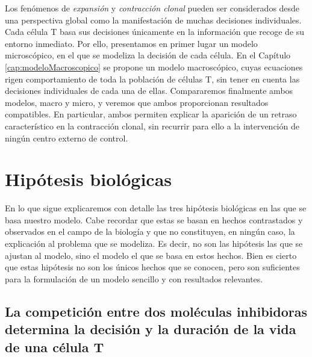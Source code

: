 Los fenómenos de \textit{expansión} y \textit{contracción clonal} pueden ser considerados desde una perspectiva global como la manifestación de muchas decisiones individuales. Cada célula T basa sus decisiones únicamente en la información que recoge de su entorno inmediato. Por ello, presentamos en primer lugar un modelo microscópico, en el que se modeliza la decisión de cada célula. En el Capítulo \ref{cap:modeloMacroscopico} se propone un modelo macroscópico, cuyas ecuaciones rigen comportamiento de toda la población de células T, sin tener en cuenta las decisiones individuales de cada una de ellas. Compararemos finalmente ambos modelos, macro y micro,  y veremos que ambos proporcionan resultados compatibles. En particular, ambos permiten explicar la aparición de un retraso característico en la contracción clonal, sin recurrir para ello a la intervención de ningún centro externo de control.


 
\section{Hipótesis biológicas} 
\label{sec:hip_bio}

En lo que sigue explicaremos con detalle las tres hipótesis biológicas en las que se basa nuestro modelo. Cabe recordar que estas se basan en hechos contrastados y observados en el campo de la biología y que no constituyen, en ningún caso, la explicación al problema que se modeliza. Es decir, no son las hipótesis las que se ajustan al modelo, sino el modelo el que se basa en estos hechos.
Bien es cierto que estas hipótesis no son los únicos hechos que se conocen, pero son suficientes para la formulación de un modelo sencillo y con resultados relevantes. %

\subsection{La competición entre dos moléculas inhibidoras determina la decisión y la duración de la vida de una célula T}
\label{subsec:hip_1}
	 
